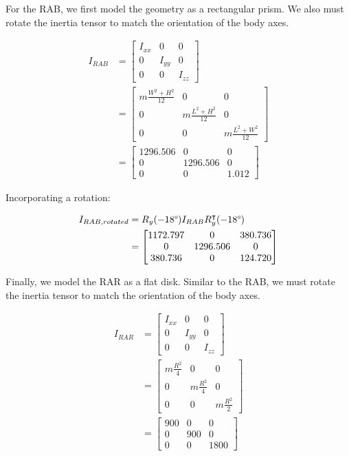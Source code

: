 For the RAB, we first model the geometry as a rectangular prism. We also must rotate the inertia tensor to match the orientation of the body axes.

\begin{align*}
I_{RAB} &=
\begin{bmatrix}
I_{xx} & 0 & 0 \\
0 & I_{yy} & 0 \\
0 & 0 & I_{zz}
\end{bmatrix} \\
&=
\begin{bmatrix}
m \frac{W^{2} + H^{2}}{12} & 0 & 0 \\
0 & m \frac{L^{2} + H^{2}}{12} & 0 \\
0 & 0 & m \frac{L^{2} + W^{2}}{12} 
\end{bmatrix} \\
&=
\begin{bmatrix}
1296.506 & 0 & 0 \\
0 & 1296.506 & 0 \\
0 & 0 & 1.012 
\end{bmatrix}
\end{align*}

Incorporating a rotation:

\begin{align*}
I_{RAB,rotated} &= R_{y}(-18\degree) I_{RAB} R_{y}^{\intercal}(-18\degree) \\
&=
\begin{bmatrix}
1172.797 & 0 & 380.736 \\
0 & 1296.506 & 0 \\
380.736 & 0 & 124.720
\end{bmatrix}
\end{align*}

Finally, we model the RAR as a flat disk. Similar to the RAB, we must rotate the inertia tensor to match the orientation of the body axes.

\begin{align*}
I_{RAR} &=
\begin{bmatrix}
I_{xx} & 0 & 0 \\
0 & I_{yy} & 0 \\
0 & 0 & I_{zz}
\end{bmatrix} \\
&=
\begin{bmatrix}
m \frac{R^{2}}{4} & 0 & 0 \\
0 & m \frac{R^{2}}{4} & 0 \\
0 & 0 & m \frac{R^{2}}{2} 
\end{bmatrix} \\
&=
\begin{bmatrix}
900 & 0 & 0 \\
0 & 900 & 0 \\
0 & 0 & 1800 
\end{bmatrix}
\end{align*}

